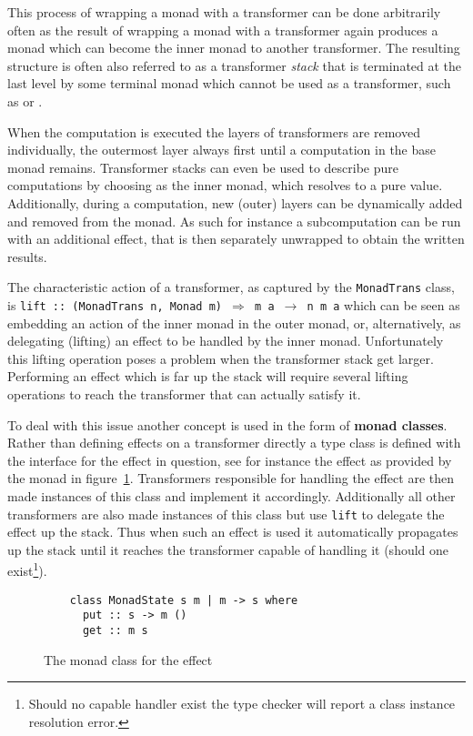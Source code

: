 This process of wrapping a monad with a transformer can be done arbitrarily
often as the result of wrapping a monad with a transformer again produces a
monad which can become the inner monad to another transformer. The resulting
structure is often also referred to as a transformer \emph{stack} that is
terminated at the last level by some terminal monad which cannot be used as a
transformer, such as \IOM{} or \HandlerForM{}.

When the computation is executed the layers of transformers are removed
individually, the outermost layer always first until a computation in the base
monad remains. Transformer stacks can even be used to describe pure computations
by choosing \IdentityM{} as the inner monad, which resolves to a pure value.
Additionally, during a computation, new (outer) layers can be dynamically added
and removed from the monad. As such for instance a subcomputation can be run
with an additional \WriterM{} effect, that is then separately unwrapped to
obtain the written results.

The characteristic action of a transformer, as captured by the
\texttt{MonadTrans} class, is \texttt{lift :: (MonadTrans n, Monad m)
  $\Rightarrow$ m a $\rightarrow$ n m a} which can be seen as embedding an
action of the inner monad in the outer monad, or, alternatively, as delegating
(lifting) an effect to be handled by the inner monad. Unfortunately this lifting
operation poses a problem when the transformer stack get larger. Performing an
effect which is far up the stack will require several lifting operations to
reach the transformer that can actually satisfy it.

To deal with this issue another concept is used in the form of \textbf{monad
  classes}. Rather than defining effects on a transformer directly a type class
is defined with the interface for the effect in question, see for instance the
effect as provided by the \StateM{} monad in
figure~\ref{fig:monad-class-example}. Transformers responsible for handling the
effect are then made instances of this class and implement it accordingly.
Additionally all other transformers are also made instances of this class but
use \texttt{lift} to delegate the effect up the stack. Thus when such an effect
is used it automatically propagates up the stack until it reaches the
transformer capable of handling it (should one exist\footnote{Should no capable
  handler exist the type checker will report a class instance resolution error.}).

\begin{figure}
  \begin{lstlisting}
    class MonadState s m | m -> s where
      put :: s -> m ()
      get :: m s
  \end{lstlisting}
  \caption{The monad class for the \StateM{} effect}
  \label{fig:monad-class-example}
\end{figure}

